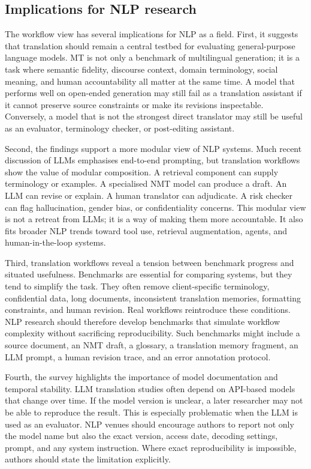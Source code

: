 \documentclass[11pt]{article}
\begin{document}
\subsection{Implications for NLP research}
The workflow view has several implications for NLP as a field. First, it suggests that translation should remain a central testbed for evaluating general-purpose language models. MT is not only a benchmark of multilingual generation; it is a task where semantic fidelity, discourse context, domain terminology, social meaning, and human accountability all matter at the same time. A model that performs well on open-ended generation may still fail as a translation assistant if it cannot preserve source constraints or make its revisions inspectable. Conversely, a model that is not the strongest direct translator may still be useful as an evaluator, terminology checker, or post-editing assistant.

Second, the findings support a more modular view of NLP systems. Much recent discussion of LLMs emphasises end-to-end prompting, but translation workflows show the value of modular composition. A retrieval component can supply terminology or examples. A specialised NMT model can produce a draft. An LLM can revise or explain. A human translator can adjudicate. A risk checker can flag hallucination, gender bias, or confidentiality concerns. This modular view is not a retreat from LLMs; it is a way of making them more accountable. It also fits broader NLP trends toward tool use, retrieval augmentation, agents, and human-in-the-loop systems.

Third, translation workflows reveal a tension between benchmark progress and situated usefulness. Benchmarks are essential for comparing systems, but they tend to simplify the task. They often remove client-specific terminology, confidential data, long documents, inconsistent translation memories, formatting constraints, and human revision. Real workflows reintroduce these conditions. NLP research should therefore develop benchmarks that simulate workflow complexity without sacrificing reproducibility. Such benchmarks might include a source document, an NMT draft, a glossary, a translation memory fragment, an LLM prompt, a human revision trace, and an error annotation protocol.

Fourth, the survey highlights the importance of model documentation and temporal stability. LLM translation studies often depend on API-based models that change over time. If the model version is unclear, a later researcher may not be able to reproduce the result. This is especially problematic when the LLM is used as an evaluator. NLP venues should encourage authors to report not only the model name but also the exact version, access date, decoding settings, prompt, and any system instruction. Where exact reproducibility is impossible, authors should state the limitation explicitly.
\end{document}
